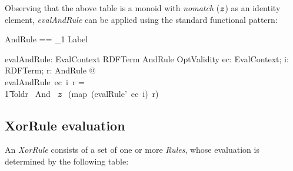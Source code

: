 \documentclass[fuzz]{llncs}
\def\nomatch{\textbf{\textit{z}}}
\def\zc{\textit}
\begin{document}
Observing that the above table is a monoid with \zc{nomatch} ($\nomatch$) as an identity
element, \zc{evalAndRule} can be applied using the standard functional pattern:
\begin{zed}
AndRule == \seq_1 Label
\end{zed}
\begin{axdef}
   evalAndRule: EvalContext \fun RDFTerm \fun AndRule \fun OptValidity
\where
   \forall ec: EvalContext; i: RDFTerm; r: AndRule  @ \\
	evalAndRule~ec~i~r = \\
\t1	foldr~ And~ \nomatch ~ (map~(evalRule'~ec~i)~r)
\end{axdef}

\subsection{XorRule evaluation}
An \zc{XorRule} consists of a set of one or more \zc{Rules}, whose evaluation is determined
by the following table: \\
\end{document}
